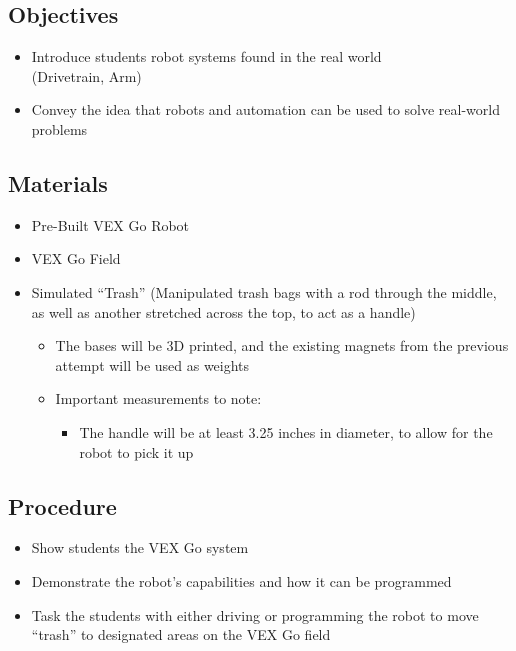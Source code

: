 \documentclass{article}
\begin{document}
    \subsection*{Objectives}
        \begin{itemize}
            \item Introduce students robot systems found in the real world \\(Drivetrain, Arm)
            \item Convey the idea that robots and automation can be used to solve real-world problems
        \end{itemize}
    \subsection*{Materials}
        \begin{itemize}
            \item Pre-Built VEX Go Robot
            \item VEX Go Field 
            \item Simulated ``Trash'' (Manipulated trash bags with a rod through the middle, as well as another stretched across the top, to act as a handle)
            \begin{itemize}
                \item The bases will be 3D printed, and the existing magnets from the previous attempt will be used as weights
                \item Important measurements to note:
                \begin{itemize}
                    \item The handle will be at least 3.25 inches in diameter, to allow for the robot to pick it up
                \end{itemize}
            \end{itemize} 
        \end{itemize}
    \subsection*{Procedure}
        \begin{itemize}
            \item Show students the VEX Go system
            \item Demonstrate the robot's capabilities and how it can be programmed
            \item Task the students with either driving or programming the robot to move ``trash'' to designated areas on the VEX Go field
        \end{itemize} 
\pagebreak  
\end{document}
